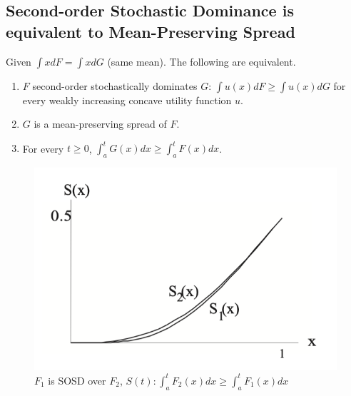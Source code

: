 \documentclass[11pt]{elegantbook}
\begin{document}
\subsection{Second-order Stochastic Dominance is equivalent to Mean-Preserving Spread}
\begin{theorem}\label{SOSD_equiv}
    Given $\int x dF=\int x dG$ (same mean). The following are equivalent.
    \begin{enumerate}
        \item $F$ second-order stochastically dominates $G$: $\int u (x) dF \geq \int u(x) dG$  for every weakly increasing concave utility function $u$.
        \item $G$ is a mean-preserving spread of $F$.
        \item For every $t\geq 0$, $\int_a^t G(x)dx\geq \int_a^t F(x)dx$.
    \end{enumerate}
\end{theorem}
\begin{center}\begin{figure}[htbp]
    \centering
    \includegraphics[scale=0.25]{SOSD_3.png}
    \caption{$F_1$ is SOSD over $F_2$, $S(t):\int_a^t F_2(x)dx\geq \int_a^t F_1(x)dx$}
    \label{}
\end{figure}\end{center}
\end{document}
